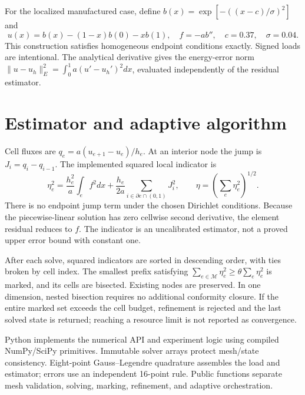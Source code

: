 \documentclass[10pt,a4paper]{article}
\begin{document}
For the localized manufactured case, define $b(x)=\exp[-((x-c)/\sigma)^2]$ and
\begin{equation}
u(x)=b(x)-(1-x)b(0)-xb(1),\quad f=-ab'',\quad c=0.37,\quad\sigma=0.04.
\end{equation}
This construction satisfies homogeneous endpoint conditions exactly. Signed loads are intentional. The analytical derivative gives the energy-error norm $\|u-u_h\|_E^2=\int_0^1a(u'-u_h')^2dx$, evaluated independently of the residual estimator.
\newpage
\section{Estimator and adaptive algorithm}
Cell fluxes are $q_e=a(u_{e+1}-u_e)/h_e$. At an interior node the jump is $J_i=q_i-q_{i-1}$. The implemented squared local indicator is
\begin{equation}
\eta_e^2=\frac{h_e^2}{a}\int_e f^2dx+
\frac{h_e}{2a}\sum_{i\in\partial e\cap(0,1)}J_i^2,
\qquad \eta=\left(\sum_e\eta_e^2\right)^{1/2}.
\end{equation}
There is no endpoint jump term under the chosen Dirichlet conditions. Because the piecewise-linear solution has zero cellwise second derivative, the element residual reduces to $f$. The indicator is an uncalibrated estimator, not a proved upper error bound with constant one.

After each solve, squared indicators are sorted in descending order, with ties broken by cell index. The smallest prefix satisfying $\sum_{e\in\mathcal M}\eta_e^2\ge\theta\sum_e\eta_e^2$ is marked, and its cells are bisected. Existing nodes are preserved. In one dimension, nested bisection requires no additional conformity closure. If the entire marked set exceeds the cell budget, refinement is rejected and the last solved state is returned; reaching a resource limit is not reported as convergence.

Python implements the numerical API and experiment logic using compiled NumPy/SciPy primitives. Immutable solver arrays protect mesh/state consistency. Eight-point Gauss--Legendre quadrature assembles the load and estimator; errors use an independent 16-point rule. Public functions separate mesh validation, solving, marking, refinement, and adaptive orchestration.
\end{document}
